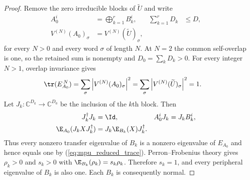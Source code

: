 \begin{proof}\leanok
    Remove the zero irreducible blocks of $\widetilde U$ and write
    \begin{align}
        A_0^i & =\bigoplus_{k=1}^{r}B_k^i,
              & \sum_{k=1}^{r}D_k              & \leq D, \\
        V^{(N)}(A_0)_\sigma
              & =V^{(N)}(\widetilde U)_\sigma,
    \end{align}
    for every $N>0$ and every word $\sigma$ of length $N$.
    At $N=2$ the common self-overlap is one, so the retained sum is nonempty
    and $D_0=\sum_kD_k>0$. For every integer $N>1$, overlap invariance gives
    \begin{align}
        \tr(E_{A_0}^{\,N})
         & =\sum_\sigma\left|V^{(N)}(A_0)_\sigma\right|^2
        =\sum_\sigma\left|V^{(N)}(\widetilde U)_\sigma\right|^2
        =1.
        \label{eq:mpu_reduced_trace}
    \end{align}
    Let $J_k:\mathbb C^{D_k}\to\mathbb C^{D_0}$ be the inclusion of the
    $k$th block. Then
    \begin{align}
        J_k^\dagger J_k & =\Id,
                        & A_0^iJ_k                    & =J_kB_k^i, \\
        \E_{A_0}(J_kXJ_k^\dagger)
                        & =J_k\E_{B_k}(X)J_k^\dagger.
    \end{align}
    Thus every nonzero transfer eigenvalue of $B_k$ is a nonzero eigenvalue of
    $E_{A_0}$ and hence equals one by
    (\ref{eq:mpu_reduced_trace}). Perron--Frobenius theory gives
    $\rho_k>0$ and $s_k>0$ with
    $\E_{B_k}(\rho_k)=s_k\rho_k$. Therefore $s_k=1$, and every peripheral
    eigenvalue of $B_k$ is also one. Each $B_k$ is consequently normal.


\end{proof}
